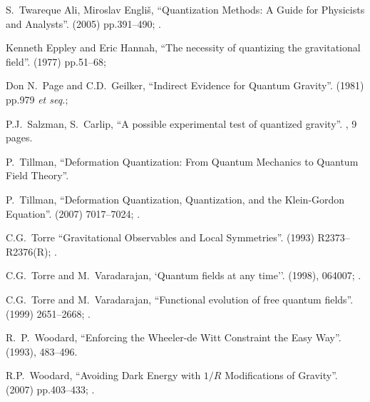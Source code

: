 \begin{thebibliography}{99}
S.~Twareque Ali, Miroslav Engli\v{s},
``Quantization Methods: A Guide for Physicists and Analysts''.
  (2005) pp.391--490;
.\\
{\tt{}}

 Kenneth Eppley and Eric Hannah,
``The necessity of quantizing the gravitational field''.
  (1977) pp.51--68;
{\tt{}}

 Don N.~Page and C.D.~Geilker,
``Indirect Evidence for Quantum Gravity''.
  (1981) pp.979 \emph{et seq.};
{\tt{}}

 P.J.~Salzman, S.~Carlip,
``A possible experimental test of quantized gravity''. , 9 pages.

 P.~Tillman, ``Deformation Quantization: From Quantum Mechanics to
Quantum Field Theory''. 

 P.~Tillman, ``Deformation Quantization, Quantization, and the
Klein-Gordon Equation''.
  (2007) 7017--7024; .\\
{\tt{}}

C.G.~Torre
``Gravitational Observables and Local Symmetries''.
  (1993) R2373--R2376(R); .\newline
{\tt{}}

C.G.~Torre and M.~Varadarajan,
`Quantum fields at any time''.
  (1998), 064007; .\newline
{\tt{}}

C.G.~Torre and M.~Varadarajan,
``Functional evolution of free quantum fields''.
  (1999) 2651--2668; .\newline
{\tt{}}

R.~P.~Woodard,
``Enforcing the Wheeler-de Witt Constraint the Easy Way''.
  (1993), 483--496.\\
{\tt{}}

 R.P.~Woodard,
  ``Avoiding Dark Energy with $1/R$ Modifications of Gravity''.
    (2007) pp.403--433; .\\
{\tt{}}


\end{thebibliography}
